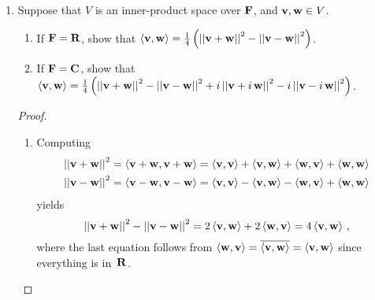 \documentclass[11pt]{amsart}
\begin{document}
\begin{enumerate}[(1)]
\begin{proof}
\begin{enumerate}
\item We apply Gram--Schmidt to the basis $\left( 1, x, x^2 \right)$ of $\P_2(\C)$.
From part (b) we know $\norm 1 = \sqrt 2$, so the first basis vector (polynomial) is $\e_1 = \frac{ 1 }{ \sqrt 2 }$.
To compute $\e_2$, we calculate
\[
  x - \inner x {\e_1} \e_1
  = x - \frac{ 1 }{ 2 } \int_{ -1 }^1 x \, dx
  = x
\]
and so (using part (a)) $\e_2 = \frac{ x }{ \norm x } = \sqrt{ \frac 3 2 } \, x$.
To compute $\e_3$,
\[
  x^2 - \inner {x^2} {\e_1} \e_1 - \inner {x^2} {\e_2} \e_2
  = x^2 - \frac{ 1 }{ 2 } \int_{ -1 }^1 x^2 \, dx - \frac 3 2 \, x \int_{ -1 }^1 x^3 \, dx
  = x^2 - \frac{ 1 }{ 3 }
\]
and so $\e_3 = \frac{ x^2 - \frac{ 1 }{ 3 } }{ \norm{ x^2 - \frac{ 1 }{ 3 } } } = \sqrt{ \frac{ 45 }{ 8 }  }  \left( x^2 - \frac{ 1 }{ 3 } \right) $.

\emph{Remark:} We have just computed the first three \emph{Legendre polynomials}. \qedhere

\end{enumerate}
\end{proof}

\item Suppose that $V$ is an inner-product space over $\mathbf{F}$, and $\mathbf v, \mathbf w \in V$.
  \begin{enumerate}
  \item If $\mathbf{F} = \mathbf{R}$, show that $\left< \mathbf v, \mathbf w \right> = \frac 1 4 \left( \left|\left|  \mathbf v + \mathbf w  \right|\right|^2 - \left|\left|  \mathbf v - \mathbf w  \right|\right|^2 \right)$.
  \item If $\mathbf{F} = \mathbf{C}$, show that $\left< \mathbf v, \mathbf w \right> = \frac 1 4 \left( \left|\left|  \mathbf v + \mathbf w  \right|\right|^2 - \left|\left|  \mathbf v - \mathbf w  \right|\right|^2 + i \left|\left|  \mathbf v + i \, \mathbf w  \right|\right|^2 - i \left|\left|  \mathbf v - i \, \mathbf w  \right|\right|^2 \right)$.
  \end{enumerate}

\begin{proof}
\begin{enumerate}

\item Computing
\begin{align*}
  \left|\left|  \mathbf v + \mathbf w  \right|\right|^2 &= \left<  \mathbf v+\mathbf w ,  \mathbf v+\mathbf w  \right> = \left< \mathbf v, \mathbf v \right> + \left< \mathbf v, \mathbf w \right> + \left< \mathbf w, \mathbf v \right> + \left< \mathbf w, \mathbf w \right> \\
  \left|\left|  \mathbf v - \mathbf w  \right|\right|^2 &= \left<  \mathbf v-\mathbf w ,  \mathbf v-\mathbf w  \right> = \left< \mathbf v, \mathbf v \right> - \left< \mathbf v, \mathbf w \right> - \left< \mathbf w, \mathbf v \right> + \left< \mathbf w, \mathbf w \right>
\end{align*}
yields
\[
  \left|\left|  \mathbf v + \mathbf w  \right|\right|^2 - \left|\left|  \mathbf v - \mathbf w  \right|\right|^2 
  = 2 \left< \mathbf v, \mathbf w \right> + 2 \left< \mathbf w, \mathbf v \right> 
  = 4 \left< \mathbf v, \mathbf w \right> \, ,
\]
where the last equation follows from $\left< \mathbf w, \mathbf v \right> = \overline{ \left< \mathbf v, \mathbf w \right> } = \left< \mathbf v, \mathbf w \right>$ since everything is in~$\mathbf{R}$.


\end{enumerate}
\end{proof}
\end{enumerate}
\end{document}
